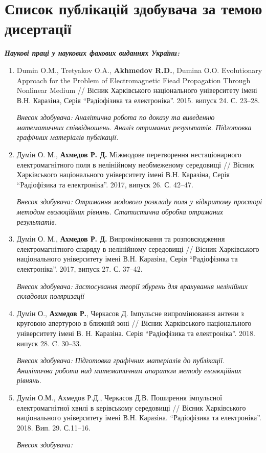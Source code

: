 \chapter{Список публікацій здобувача за темою дисертації}

\begin{center} 
\textit{\textbf{Наукові праці у наукових фахових виданнях України:}}
\end{center}


\begin{enumerate}

\item Dumin O.M., Tretyakov O.A., \textbf{Akhmedov R.D.}, Dumina O.O. 
Evolutionary Approach for the Problem of Electromagnetic Fiead 
Propagation Through Nonlinear Medium // Вісник Харківського національного 
університету імені В.Н. Каразіна, Серія ``Радіофізика та електроніка''. 
2015. випуск 24. С. 23--28.

\textit{Внесок здобувача: Аналітична робота по доказу та виведенню 
математичних співвідношень. Аналіз отриманих результатів. Підготовка 
графічних матеріалів публікації.}

\item Думін О. М., \textbf{Ахмедов Р. Д.} Міжмодове перетворення нестаціонарного 
електромагнітного поля в нелінійному необмеженому середовищі // Вісник 
Харківського національного університету імені В.Н. Каразіна, Серія 
``Радіофізика та електроніка''. 2017, випуск 26. С. 42--47.

\textit{Внесок здобувача: Отримання модового розкладу поля у відкритому 
просторі методом еволюційних рівнянь. Статистична обробка отриманих результатів. }

\item Думін О. М., \textbf{Ахмедов Р. Д.} Випромінювання та розповсюдження 
електромагнітного снаряду в нелінійному середовищі // Вісник 
Харківського національного університету імені В.Н. Каразіна, Серія 
``Радіофізика та електроніка''. 2017, випуск 27. С. 37--42.

\textit{Внесок здобувача: Застосування теорії збурень для врахування 
нелінійних складових поляризації}

\item Думін О., \textbf{Ахмедов Р.}, Черкасов Д. Імпульсне випромінювання 
антени з круговою апертурою в ближній зоні // Вісник Харківського 
національного університету імені В. Н. Каразіна. Серія ``Радіофізика та 
електроніка''. 2018. випуск 28. C. 30--33.

\textit{Внесок здобувача: Підготовка графічних матеріалів до публікації. 
Аналітична робота над математичним апаратом методу еволюційних рівнянь.}

\item Думін О.М., Ахмедов Р.Д., Черкасов Д.В. Поширення імпульсної 
електромагнітної хвилі в керівському середовищі // Вісник Харківського 
національного університету імені В.Н. Каразіна. ``Радіофізика та 
електроніка''. 2018. Вип. 29. С.11--16.

\textit{Внесок здобувача: }

\setcounter{ItemsInMyWriting}{\value{enumi}}
\end{enumerate}

